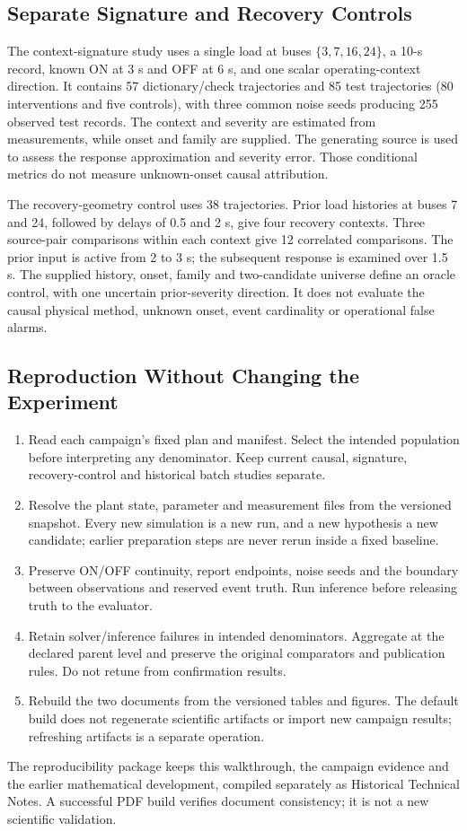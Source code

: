 \subsection{Separate Signature and Recovery Controls}

The context-signature study uses a single load at buses
$\{3,7,16,24\}$, a 10-s record, known ON at 3 s and OFF at 6 s,
and one scalar operating-context direction. It contains 57 dictionary/check
trajectories and 85 test trajectories (80 interventions and five controls),
with three common noise seeds producing 255 observed test records.
The context and severity are estimated from measurements, while onset
and family are supplied. The generating source is used to assess the
response approximation and severity error. Those conditional metrics do
not measure unknown-onset causal attribution.

The recovery-geometry control uses 38 trajectories. Prior load
histories at buses 7 and 24, followed by delays of 0.5 and 2 s,
give four recovery contexts. Three source-pair comparisons within each
context give 12 correlated comparisons. The prior input is active from
2 to 3 s; the subsequent response is examined over 1.5 s. The supplied
history, onset, family and two-candidate universe define an oracle control,
with one uncertain prior-severity direction. It does not evaluate the causal physical method,
unknown onset, event cardinality or operational false alarms.

\subsection{Reproduction Without Changing the Experiment}

\begin{enumerate}
\item Read each campaign's fixed plan and manifest. Select the intended
population before interpreting any denominator. Keep current causal,
signature, recovery-control and historical batch studies separate.
\item Resolve the plant state, parameter and measurement files from the
versioned snapshot. Every new simulation is a new run, and a new hypothesis
a new candidate; earlier preparation steps are never rerun inside a fixed
baseline.
\item Preserve ON/OFF continuity, report endpoints, noise seeds and the
boundary between observations and reserved event truth. Run inference
before releasing truth to the evaluator.
\item Retain solver/inference failures in intended denominators. Aggregate
at the declared parent level and preserve the original comparators and
publication rules. Do not retune from confirmation results.
\item Rebuild the two documents from the versioned tables and figures.
The default build does not regenerate scientific artifacts or import new
campaign results; refreshing artifacts is a separate operation.
\end{enumerate}

The reproducibility package keeps this walkthrough, the campaign evidence
and the earlier mathematical development, compiled separately as
Historical Technical Notes. A successful PDF
build verifies document consistency; it is not a new scientific validation.
\FloatBarrier
